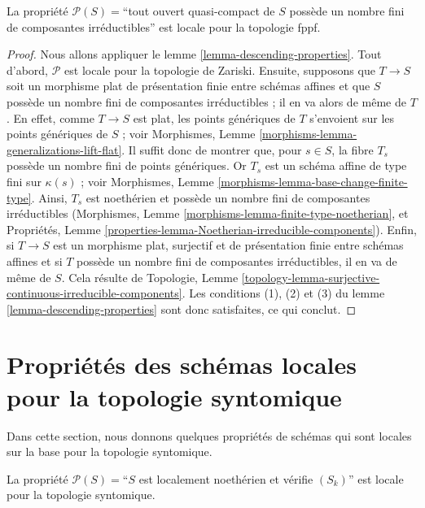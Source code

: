 \begin{lemma}
\label{lemma-locally-finite-nr-irred-local-fppf}
La propriété $\mathcal{P}(S) =$``tout ouvert quasi-compact de $S$ possède
un nombre fini de composantes irréductibles'' est locale pour la topologie
fppf.
\end{lemma}

\begin{proof}
Nous allons appliquer le lemme \ref{lemma-descending-properties}.
Tout d'abord, $\mathcal{P}$ est locale pour la topologie de Zariski.
Ensuite, supposons que $T \to S$ soit un morphisme plat de présentation
finie entre schémas affines et que $S$ possède un nombre fini de composantes
irréductibles ; il en va alors de même de $T$. En effet, comme $T \to S$ est
plat, les points génériques de $T$ s'envoient sur les points génériques de
$S$ ; voir Morphismes, Lemme
\ref{morphisms-lemma-generalizations-lift-flat}. Il suffit donc de montrer
que, pour $s \in S$, la fibre $T_s$ possède un nombre fini de points
génériques. Or $T_s$ est un schéma affine de type fini sur $\kappa(s)$ ;
voir Morphismes, Lemme \ref{morphisms-lemma-base-change-finite-type}.
Ainsi, $T_s$ est noethérien et possède un nombre fini de composantes
irréductibles (Morphismes, Lemme
\ref{morphisms-lemma-finite-type-noetherian}, et Propriétés, Lemme
\ref{properties-lemma-Noetherian-irreducible-components}). Enfin, si
$T \to S$ est un morphisme plat, surjectif et de présentation finie entre
schémas affines et si $T$ possède un nombre fini de composantes
irréductibles, il en va de même de $S$. Cela résulte de Topologie, Lemme
\ref{topology-lemma-surjective-continuous-irreducible-components}.
Les conditions (1), (2) et (3) du lemme
\ref{lemma-descending-properties} sont donc satisfaites, ce qui conclut.
\end{proof}




\section{Propriétés des schémas locales pour la topologie syntomique}
\label{section-descending-properties-syntomic}

\noindent
Dans cette section, nous donnons quelques propriétés de schémas qui sont
locales sur la base pour la topologie syntomique.

\begin{lemma}
\label{lemma-Sk-local-syntomic}
La propriété $\mathcal{P}(S) =$``$S$ est localement noethérien et vérifie
$(S_k)$'' est locale pour la topologie syntomique.
\end{lemma}


